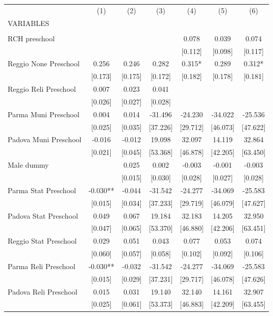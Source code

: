\begin{tabular}{lcccccc} \hline
 & (1) & (2) & (3) & (4) & (5) & (6) \\
VARIABLES &  &  &  &  &  &  \\ \hline
 &  &  &  &  &  &  \\
RCH preschool &  &  &  & 0.078 & 0.039 & 0.074 \\
 &  &  &  & [0.112] & [0.098] & [0.117] \\
Reggio None Preschool & 0.256 & 0.246 & 0.282 & 0.315* & 0.289 & 0.312* \\
 & [0.173] & [0.175] & [0.172] & [0.182] & [0.178] & [0.181] \\
Reggio Reli Preschool & 0.007 & 0.023 & 0.041 &  &  &  \\
 & [0.026] & [0.027] & [0.028] &  &  &  \\
Parma Muni Preschool & 0.004 & 0.014 & -31.496 & -24.230 & -34.022 & -25.536 \\
 & [0.025] & [0.035] & [37.226] & [29.712] & [46.073] & [47.622] \\
Padova Muni Preschool & -0.016 & -0.012 & 19.098 & 32.097 & 14.119 & 32.864 \\
 & [0.021] & [0.045] & [53.368] & [46.878] & [42.205] & [63.450] \\
Male dummy &  & 0.025 & 0.002 & -0.003 & -0.001 & -0.003 \\
 &  & [0.015] & [0.030] & [0.028] & [0.027] & [0.028] \\
Parma Stat Preschool & -0.030** & -0.044 & -31.542 & -24.277 & -34.069 & -25.583 \\
 & [0.015] & [0.034] & [37.233] & [29.719] & [46.079] & [47.627] \\
Padova Stat Preschool & 0.049 & 0.067 & 19.184 & 32.183 & 14.205 & 32.950 \\
 & [0.047] & [0.065] & [53.370] & [46.880] & [42.206] & [63.451] \\
Reggio Stat Preschool & 0.029 & 0.051 & 0.043 & 0.077 & 0.053 & 0.074 \\
 & [0.060] & [0.057] & [0.058] & [0.102] & [0.092] & [0.106] \\
Parma Reli Preschool & -0.030** & -0.032 & -31.542 & -24.277 & -34.069 & -25.583 \\
 & [0.015] & [0.029] & [37.231] & [29.717] & [46.078] & [47.626] \\
Padova Reli Preschool & 0.015 & 0.031 & 19.140 & 32.140 & 14.161 & 32.907 \\
 & [0.025] & [0.061] & [53.373] & [46.883] & [42.209] & [63.455] \\

\end{tabular}
